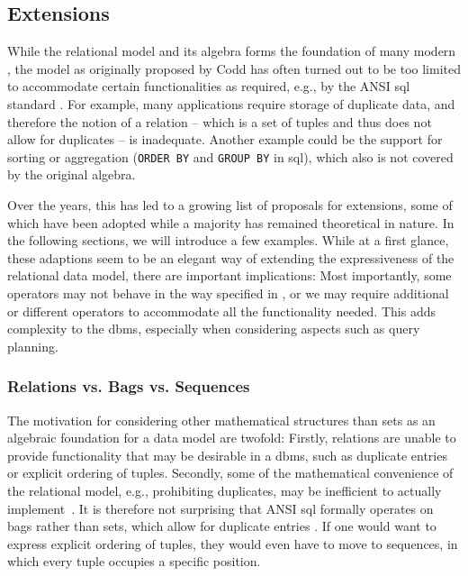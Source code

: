 \clearpage

\subsection{Extensions}
\label{section:rel_extensions}

While the relational model and its algebra forms the foundation of many modern , the model as originally proposed by Codd has often turned out to be too limited to accommodate certain functionalities as required, e.g., by the ANSI \acrshort{sql} standard \cite{Libkin:2003Expressive,XOpen:1996SQL}. For example, many applications require storage of duplicate data, and therefore the notion of a relation -- which is a set of tuples and thus does not allow for duplicates -- is inadequate. Another example could be the support for sorting or aggregation (\texttt{ORDER BY} and \texttt{GROUP BY} in \acrshort{sql}), which also is not covered by the original algebra.

Over the years, this has led to a growing list of proposals for extensions, some of which have been adopted while a majority has remained theoretical in nature. In the following sections, we will introduce a few examples. While at a first glance, these adaptions seem to be an elegant way of extending the expressiveness of the relational data model, there are important implications: Most importantly, some operators may not behave in the way specified in , or we may require additional or different operators to accommodate all the functionality needed. This adds complexity to the \acrshort{dbms}, especially when considering aspects such as query planning.

\subsubsection{Relations vs. Bags vs. Sequences}

The motivation for considering other mathematical structures than sets as an algebraic foundation for a data model are twofold: Firstly, relations are unable to provide functionality that may be desirable in a \acrshort{dbms}, such as duplicate entries or explicit ordering of tuples. Secondly, some of the mathematical convenience of the relational model, e.g., prohibiting duplicates, may be inefficient to actually implement~\cite{Garcia:2009Database}. It is therefore not surprising that ANSI \acrshort{sql}  \cite{XOpen:1996SQL} formally operates on bags rather than sets, which allow for duplicate entries \cite{Garcia:2009Database,Chamberlin:2012Early}. If one would want to express explicit ordering of tuples, they would even have to move to sequences, in which every tuple occupies a specific position.

